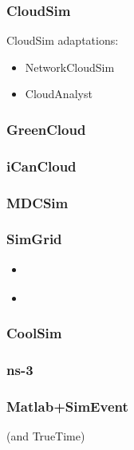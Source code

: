 \subsubsection{CloudSim} \cite{cloudsim}

CloudSim adaptations:
\begin{itemize}
\item NetworkCloudSim \cite{6123487}
\item CloudAnalyst \cite{wickremasinghe2010cloudanalyst}
\end{itemize}


\subsubsection{GreenCloud}
\cite{greencloud}


\subsubsection{iCanCloud}
\cite{icancloud}


\subsubsection{MDCSim}
\cite{5289159}


\subsubsection{SimGrid} 
\cite{simgrid}

\begin{itemize}
\item \cite{4488918}
\item \cite{bobelin2012scalable}
\end{itemize}


\subsubsection{CoolSim}
\cite{coolsim}


\subsubsection{ns-3}
\cite{ns3}


\subsubsection{Matlab+SimEvent} (and TrueTime)
